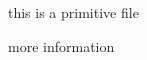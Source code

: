 \documentclass[11pt]{article}
\begin{document}
    
    this is a primitive file
    
    

    
    
    more information
    
\end{document}

